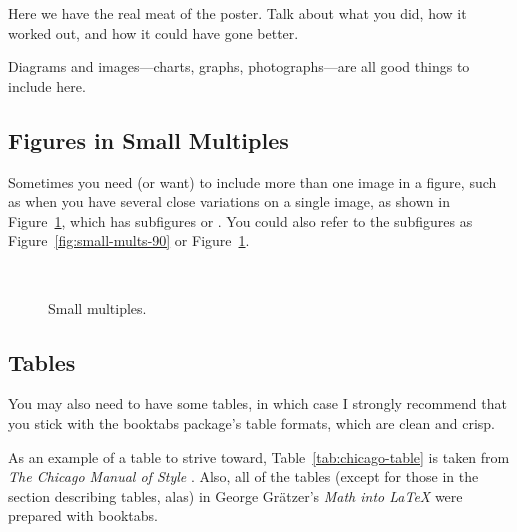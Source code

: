 \documentclass[clinic]{hmcposter}
\begin{document}
\begin{poster}
Here we have the real meat of the poster.  Talk about what you did,
how it worked out, and how it could have gone better.

Diagrams and images---charts, graphs, photographs---are all good
things to include here.


\subsection{Figures in Small Multiples}

Sometimes you need (or want) to include more than one image in a
figure, such as when you have several close variations on a single
image, as shown in Figure~\ref{fig:small-multiples}, which has
subfigures  or
.  You could also refer to the subfigures
as Figure~\ref{fig:small-mults-90} or
Figure~\ref{fig:small-multiples}.

\begin{figure}
  \centering
        \qquad\qquad
        \\
        \qquad\qquad
  \caption[Small multiples]{Small multiples.}%
  \label{fig:small-multiples}
\end{figure}

\subsection{Tables}

You may also need to have some tables, in which case I strongly
recommend that you stick with the \textsf{booktabs} package's table
formats, which are clean and crisp. \citep{fear-booktab}

As an example of a table to strive toward,
Table~\ref{tab:chicago-table} is taken from \emph{The Chicago Manual
  of Style} \citep{chicago}.  Also, all of the tables (except for
those in the section describing tables, alas) in George
Gr\"{a}tzer's \emph{Math into \LaTeX} \citeyearpar{gratzer-mil} were
prepared with \textsf{booktabs}.


\end{poster}
\end{document}
